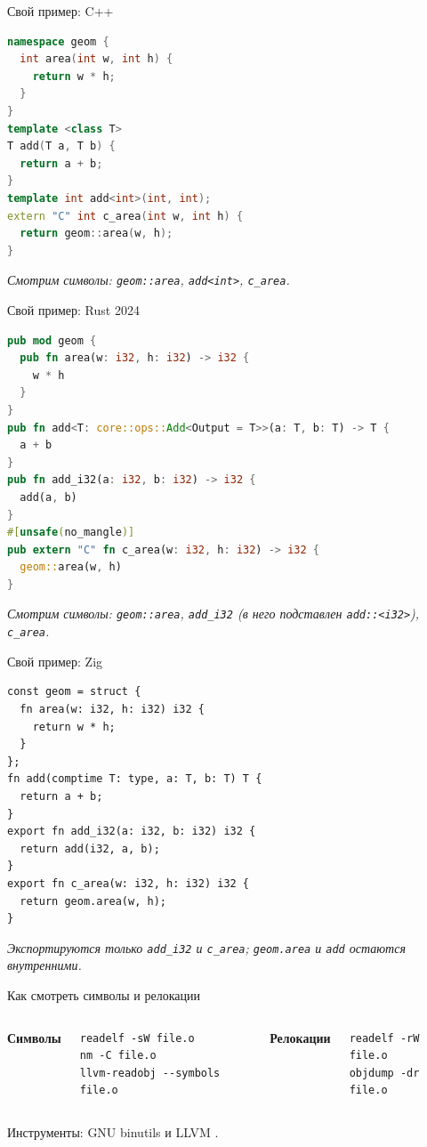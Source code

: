 \documentclass[aspectratio=169,11pt]{beamer}
\begin{document}
\begin{frame}[fragile]{Свой пример: C++}
\begin{lstlisting}[style=code, language=C++]
namespace geom {
  int area(int w, int h) {
    return w * h;
  }
}
template <class T>
T add(T a, T b) {
  return a + b;
}
template int add<int>(int, int);
extern "C" int c_area(int w, int h) {
  return geom::area(w, h);
}
\end{lstlisting}
  \smallskip
  \centering
  \textit{Смотрим символы: \texttt{geom::area}, \texttt{add<int>}, \texttt{c\_area}.}
\end{frame}

\begin{frame}[fragile]{Свой пример: Rust 2024}
\begin{lstlisting}[style=code, language=Rust, emph={i32,T}]
pub mod geom {
  pub fn area(w: i32, h: i32) -> i32 {
    w * h
  }
}
pub fn add<T: core::ops::Add<Output = T>>(a: T, b: T) -> T {
  a + b
}
pub fn add_i32(a: i32, b: i32) -> i32 {
  add(a, b)
}
#[unsafe(no_mangle)]
pub extern "C" fn c_area(w: i32, h: i32) -> i32 {
  geom::area(w, h)
}
\end{lstlisting}
  \smallskip
  \centering
  \textit{Смотрим символы: \texttt{geom::area}, \texttt{add\_i32} (в него подставлен \texttt{add::<i32>}), \texttt{c\_area}.}
\end{frame}

\begin{frame}[fragile]{Свой пример: Zig}
\begin{lstlisting}[style=code, language=Zig, emph={i32,type,T}]
const geom = struct {
  fn area(w: i32, h: i32) i32 {
    return w * h;
  }
};
fn add(comptime T: type, a: T, b: T) T {
  return a + b;
}
export fn add_i32(a: i32, b: i32) i32 {
  return add(i32, a, b);
}
export fn c_area(w: i32, h: i32) i32 {
  return geom.area(w, h);
}
\end{lstlisting}
  \smallskip
  \centering
  \textit{Экспортируются только \texttt{add\_i32} и \texttt{c\_area}; \texttt{geom.area} и \texttt{add} остаются внутренними.}
\end{frame}

\begin{frame}[fragile]{Как смотреть символы и релокации}
  \begin{columns}[T,onlytextwidth]
    \textbf{Символы}
    \begin{lstlisting}[style=shell]
readelf -sW file.o
nm -C file.o
llvm-readobj --symbols file.o
    \end{lstlisting}
    \textbf{Релокации}
    \begin{lstlisting}[style=shell]
readelf -rW file.o
objdump -dr file.o
    \end{lstlisting}
  \end{columns}
  \bigskip
  Инструменты: GNU binutils \cite{binutils} и LLVM \cite{llvmtools}.
\end{frame}
\end{document}

